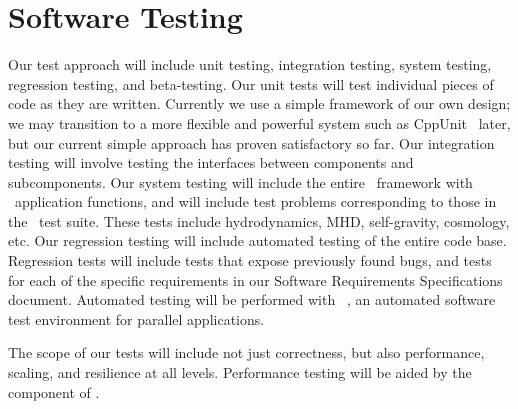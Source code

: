 \documentclass[10pt,twocolumn]{article}
\begin{document}
\section{Software Testing} \label{s:testing}



Our test approach will include unit testing, integration testing,
system testing, regression testing, and beta-testing.  Our unit tests
will test individual pieces of code as they are written.  Currently we
use a simple framework of our own design; we may transition to a more
flexible and powerful system such as CppUnit~\cite{wwwcppunit} later,
but our current simple approach has proven satisfactory so far.  Our
integration testing will involve testing the interfaces between
components and subcomponents.  Our system testing will include the
entire \cello\ framework with \enzoii\ application functions, and will
include test problems corresponding to those in the \enzo\ test suite.
These tests include hydrodynamics, MHD, self-gravity, cosmology, etc.
Our regression testing will include automated testing of the entire
code base.  Regression tests will include tests that expose previously
found bugs, and tests for each of the specific requirements in our
Software Requirements Specifications document.  Automated testing will
be performed with \lcatest~\cite{wwwlcatest}, an automated software
test environment for parallel applications.

The scope of our tests will include not just correctness, but also
performance, scaling, and resilience at all levels.  Performance
testing will be aided by the  component of \cello.
\end{document}
